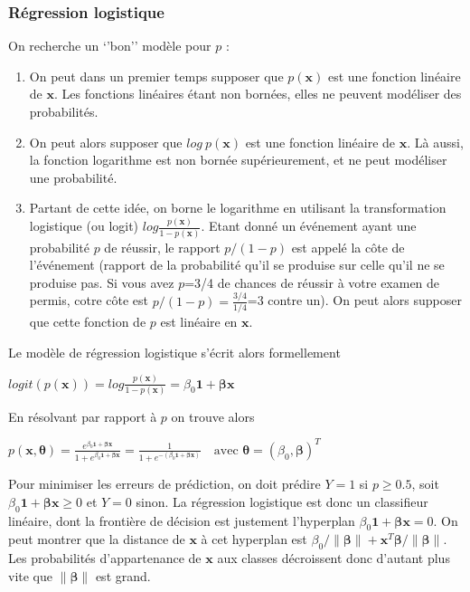 \documentclass[letterpaper,10pt,english]{jupyterBook}
\begin{document}
\subsubsection{Régression logistique}
\label{\detokenize{regression:id3}}
\sphinxAtStartPar
On recherche un ‘’bon’’ modèle pour \(p\) :
\begin{enumerate}
%
\item {} 
\sphinxAtStartPar
On peut dans un premier temps supposer que \(p(\mathbf x)\) est une fonction linéaire de \(\mathbf x\). Les fonctions linéaires étant non bornées, elles ne peuvent modéliser des probabilités.

\item {} 
\sphinxAtStartPar
On peut alors supposer que \(log\ p(\mathbf x)\) est une fonction linéaire de \(\mathbf x\). Là aussi, la fonction logarithme est non bornée supérieurement, et ne peut modéliser une probabilité.

\item {} 
\sphinxAtStartPar
Partant de cette idée, on borne le logarithme en utilisant la transformation logistique (ou logit) \(log\frac{p(\mathbf x)}{1-p(\mathbf x)}\). Etant donné un événement ayant une probabilité \(p\) de réussir, le rapport \(p/(1-p)\) est appelé la côte de l’événement (rapport de la probabilité qu’il se produise sur celle qu’il ne se produise pas. Si vous avez \(p\)=3/4 de chances de réussir à votre examen de permis, cotre côte est \(p/(1-p)=\frac{3/4}{1/4}\)=3 contre un). On peut alors supposer que cette fonction de \(p\) est linéaire en \(\mathbf x\).

\end{enumerate}

\sphinxAtStartPar
Le modèle de régression logistique s’écrit alors formellement

\sphinxAtStartPar
\(logit(p(\mathbf x)) = log \frac{p(\mathbf x)}{1-p(\mathbf x)} = \beta_0\mathbf 1 + \boldsymbol\beta\mathbf x\)

\sphinxAtStartPar
En résolvant par rapport à \(p\) on trouve alors

\sphinxAtStartPar
\(p(\mathbf x,\boldsymbol\theta) = \frac{e^{\beta_0\mathbf 1 + \boldsymbol\beta\mathbf x}}{1+e^{\beta_0\mathbf 1 + \boldsymbol\beta\mathbf x}}=\frac{1}{1+e^{-(\beta_0\mathbf 1 + \boldsymbol\beta\mathbf x)}}\quad\text{avec }\boldsymbol\theta=(\beta_0,\boldsymbol\beta)^T\)

\sphinxAtStartPar
Pour minimiser les erreurs de prédiction, on doit prédire \(Y=1\) si \(p\geq 0.5\), soit \(\beta_0\mathbf 1 + \boldsymbol\beta\mathbf x\geq 0\) et \(Y=0\) sinon. La régression logistique est donc un classifieur linéaire, dont la frontière de décision est justement l’hyperplan \(\beta_0\mathbf 1 + \boldsymbol\beta\mathbf x= 0\). On peut montrer que la distance de \(\mathbf x\) à cet hyperplan est \(\beta_0/\|\boldsymbol\beta\| + \mathbf x^T\boldsymbol\beta/\|\boldsymbol\beta\|\). Les probabilités d’appartenance de \(\mathbf x\) aux classes décroissent donc d’autant plus vite que \(\|\boldsymbol\beta\|\) est grand.
\end{document}
